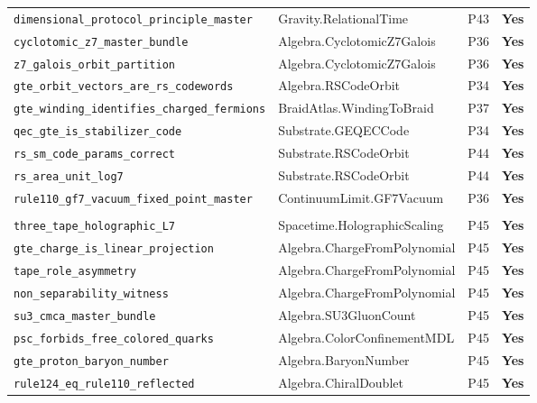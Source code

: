 \begin{longtable}{@{}p{6.3cm}p{4.6cm}p{1.5cm}p{1.5cm}@{}}
\texttt{dimensional\_protocol\_\allowbreak principle\_master}    & Gravity.RelationalTime       & P43  & \textbf{Yes} \\
\lstinline|cyclotomic_z7_master_bundle|              & Algebra.CyclotomicZ7Galois   & P36  & \textbf{Yes} \\
\lstinline|z7_galois_orbit_partition|                & Algebra.CyclotomicZ7Galois   & P36  & \textbf{Yes} \\
\lstinline|gte_orbit_vectors_are_rs_codewords|       & Algebra.RSCodeOrbit          & P34  & \textbf{Yes} \\
\texttt{gte\_winding\_identifies\_\allowbreak charged\_fermions}  & BraidAtlas.WindingToBraid    & P37  & \textbf{Yes} \\
\lstinline|qec_gte_is_stabilizer_code|               & Substrate.GEQECCode          & P34  & \textbf{Yes} \\
\lstinline|rs_sm_code_params_correct|                & Substrate.RSCodeOrbit        & P44  & \textbf{Yes} \\
\lstinline|rs_area_unit_log7|                        & Substrate.RSCodeOrbit        & P44  & \textbf{Yes} \\
\texttt{rule110\_gf7\_vacuum\_\allowbreak fixed\_point\_master}    & ContinuumLimit.GF7Vacuum     & P36  & \textbf{Yes} \\
\addlinespace[4pt]
\midrule
\addlinespace[2pt]
\multicolumn{4}{@{}l}{\textit{Three-tape CMCA}} \\
\addlinespace[2pt]
\lstinline|three_tape_holographic_L7|                & Spacetime.HolographicScaling & P45  & \textbf{Yes} \\
\lstinline|gte_charge_is_linear_projection|          & Algebra.ChargeFromPolynomial & P45  & \textbf{Yes} \\
\lstinline|tape_role_asymmetry|                      & Algebra.ChargeFromPolynomial & P45  & \textbf{Yes} \\
\lstinline|non_separability_witness|                 & Algebra.ChargeFromPolynomial & P45  & \textbf{Yes} \\
\lstinline|su3_cmca_master_bundle|                   & Algebra.SU3GluonCount        & P45  & \textbf{Yes} \\
\lstinline|psc_forbids_free_colored_quarks|           & Algebra.ColorConfinementMDL  & P45  & \textbf{Yes} \\
\lstinline|gte_proton_baryon_number|                 & Algebra.BaryonNumber         & P45  & \textbf{Yes} \\
\lstinline|rule124_eq_rule110_reflected|              & Algebra.ChiralDoublet        & P45  & \textbf{Yes} \\

\end{longtable}
